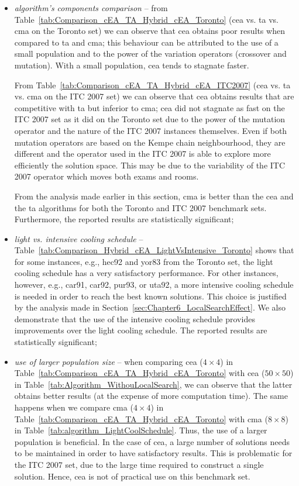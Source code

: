 \begin{itemize}
	\item \textit{algorithm's components comparison} -- from Table~\ref{tab:Comparison_cEA_TA_Hybrid_cEA_Toronto} (\gls{cea} vs. \gls{ta} vs. \gls{cma} on the Toronto set) we can observe that \gls{cea} obtains poor results when compared to \gls{ta} and \gls{cma}; this behaviour can be attributed to the use of a small population and to the power of the variation operators (crossover and mutation). With a small population, \gls{cea} tends to stagnate faster.
	
	From Table~\ref{tab:Comparison_cEA_TA_Hybrid_cEA_ITC2007} (\gls{cea} vs. \gls{ta} vs. \gls{cma} on the ITC 2007 set) we can observe that \gls{cea} obtains results that are competitive with \gls{ta} but inferior to \gls{cma}; \gls{cea} did not stagnate as fast on the ITC 2007 set as it did on the Toronto set due to the power of the mutation operator and the nature of the ITC 2007 instances themselves. Even if both mutation operators are based on the Kempe chain neighbourhood, they are different and the operator used in the ITC 2007 is able to explore more efficiently the solution space. This may be due to the variability of the ITC 2007 operator which moves both exams and rooms.
	
	From the analysis made earlier in this section, \gls{cma} is better than the \gls{cea} and the \gls{ta} algorithms for both the Toronto and ITC 2007 benchmark sets. Furthermore, the reported results are statistically significant;
	
	\item \textit{light vs. intensive cooling schedule} -- Table~\ref{tab:Comparison_Hybrid_cEA_LightVsIntensive_Toronto} shows that for some instances, e.g., hec92 and yor83 from the Toronto set, the light cooling schedule has a very satisfactory performance. For other instances, however, e.g., car91, car92, pur93, or uta92, a more intensive cooling schedule is needed in order to reach the best known solutions. This choice is justified by the analysis made in Section~\ref{sec:Chapter6_LocalSearchEffect}. We also demonstrate that the use of the intensive cooling schedule provides improvements over the light cooling schedule. The reported results are statistically significant;
	
	\item \textit{use of larger population size} -- when comparing \gls{cea} ($4 \times 4$) in Table~\ref{tab:Comparison_cEA_TA_Hybrid_cEA_Toronto} with \gls{cea} ($50 \times 50$) in Table~\ref{tab:Algorithm_WithouLocalSearch}, we can observe that the latter obtains better results (at the expense of more computation time). The same happens when we compare \gls{cma} ($4 \times 4$) in Table~\ref{tab:Comparison_cEA_TA_Hybrid_cEA_Toronto} with \gls{cma} ($8 \times 8$) in Table~\ref{tab:algorithm_LightCoolSchedule}. Thus, the use of a larger population is beneficial. In the case of \gls{cea}, a large number of solutions needs to be maintained in order to have satisfactory results. This is problematic for the ITC 2007 set, due to the large time required to construct a single solution. Hence, \gls{cea} is not of practical use on this benchmark set.
	
\end{itemize}
